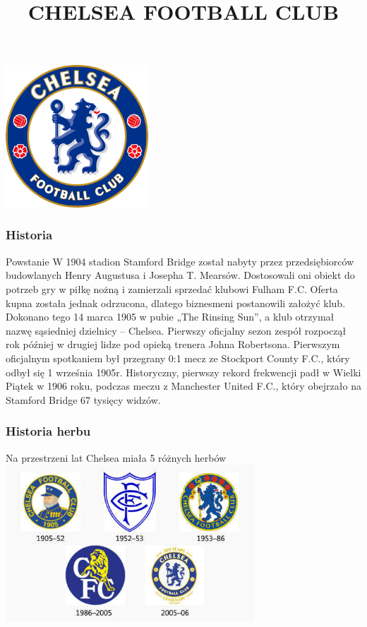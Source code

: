 \documentclass[]{beamer}
\title{CHELSEA FOOTBALL CLUB}
\date{}
\begin{document}
\frame
{
	\centering
	\includegraphics[width=0.4\textwidth]{logo.png}
	\maketitle	
}
\frame
{
	\frametitle{Historia}
	\begin{block}
		{Powstanie}
		W 1904 stadion Stamford Bridge został nabyty przez przedsiębiorców budowlanych Henry Augustusa i Josepha T. Mearsów. Dostosowali oni obiekt do potrzeb gry w piłkę nożną i zamierzali sprzedać klubowi Fulham F.C. Oferta kupna została jednak odrzucona, dlatego biznesmeni postanowili założyć klub. Dokonano tego 14 marca 1905 w pubie „The Rinsing Sun”, a klub otrzymał nazwę sąsiedniej dzielnicy – Chelsea. Pierwszy oficjalny sezon zespół rozpoczął rok później w drugiej lidze pod opieką trenera Johna Robertsona. Pierwszym oficjalnym spotkaniem był przegrany 0:1 mecz ze Stockport County F.C., który odbył się 1 września 1905r. Historyczny, pierwszy rekord frekwencji padł w Wielki Piątek w 1906 roku, podczas meczu z Manchester United F.C., który obejrzało na Stamford Bridge 67 tysięcy widzów.
	\end{block}
}
\frame
{
	\frametitle{Historia herbu}
	\begin{block}
		{Na przestrzeni lat Chelsea miała 5 różnych herbów}
		\centering
		\includegraphics[width=0.7\textwidth]{logos.jpg}
	\end{block}
}
\end{document}
